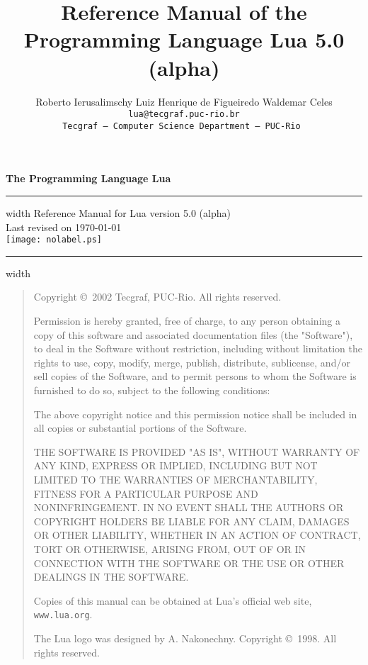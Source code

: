 \documentclass[11pt,twoside,draft]{article}
\def\tecgraf{{\sf Tecgraf}}
\newcommand{\Version}{5.0 (alpha)}
\begin{document}
\thispagestyle{empty}
\pagestyle{empty}

{
\parindent=0pt
{\LARGE\bf
The Programming Language Lua}
\hfill
\vskip4pt \hrule height 4pt width \hsize \vskip4pt
\hfill
Reference Manual for Lua version \Version
\\
\null
\hfill
Last revised on \today
\\
\vfill
\centering
\texttt{[image: nolabel.ps]}
\vfill
\vskip4pt \hrule height 2pt width \hsize
}

\newpage
\begin{quotation}
\parskip=10pt
\parindent=0pt
\footnotesize
\null\vfill

\noindent
Copyright \copyright\ 2002 Tecgraf, PUC-Rio.  All rights reserved.

Permission is hereby granted, free of charge,
to any person obtaining a copy of this software
and associated documentation files (the "Software"),
to deal in the Software without restriction,
including without limitation the rights to use, copy, modify,
merge, publish, distribute, sublicense,
and/or sell copies of the Software,
and to permit persons to whom the Software is furnished to do so,
subject to the following conditions:

The above copyright notice and this permission notice shall be
included in all copies or substantial portions of the Software.

THE SOFTWARE IS PROVIDED "AS IS", WITHOUT WARRANTY OF ANY KIND,
EXPRESS OR IMPLIED,
INCLUDING BUT NOT LIMITED TO THE WARRANTIES OF MERCHANTABILITY,
FITNESS FOR A PARTICULAR PURPOSE AND NONINFRINGEMENT.
IN NO EVENT SHALL THE AUTHORS OR COPYRIGHT HOLDERS BE LIABLE
FOR ANY CLAIM, DAMAGES OR OTHER LIABILITY,
WHETHER IN AN ACTION OF CONTRACT, TORT OR OTHERWISE,
ARISING FROM, OUT OF OR IN CONNECTION WITH THE SOFTWARE
OR THE USE OR OTHER DEALINGS IN THE SOFTWARE.


Copies of this manual can be obtained at
Lua's official web site,
\verb|www.lua.org|.

\bigskip
The Lua logo was designed by A. Nakonechny.
Copyright \copyright\ 1998.  All rights reserved.
\end{quotation}
\newpage

\title{\Large\bf Reference Manual of the Programming Language Lua \Version}

\author{%
Roberto Ierusalimschy\qquad
Luiz Henrique de Figueiredo\qquad
Waldemar Celes
\vspace{1.0ex}\\
\smallskip
\small\tt lua@tecgraf.puc-rio.br
\vspace{2.0ex}\\
\tecgraf\ --- Computer Science Department --- PUC-Rio
}
\end{document}
